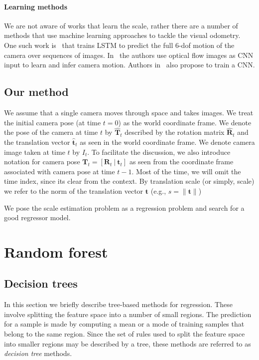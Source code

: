 \paragraph{Learning methods} We are not aware of works that learn the
scale, rather there are a number of methods that use machine learning
approaches to tackle the visual odometry.  One such work
is~\cite{wang2017deepvo} that trains LSTM to predict the full 6-dof
motion of the camera over sequences of
images. In~\cite{muller20017flowdometry} the authors use optical flow
images as CNN input to learn and infer camera motion. Authors
in~\cite{DBLP:journals/corr/MohantyADGSC16} also propose to train a
CNN.



\subsection{Our method}

We assume that a single camera moves through space and takes images.
We treat the initial camera pose (at time $t=0$) as the world
coordinate frame.  We denote the pose of the camera at time $t$ by
$\mathbf{\hat{T}}_t$ described by the rotation matrix
$\mathbf{\hat{R}}_t$ and the translation vector $\mathbf{\hat{t}}_t$
as seen in the world coordinate frame.  We denote camera image taken
at time $t$ by $I_t$.  To facilitate the discussion, we also introduce
notation for camera pose
$\mathbf{T}_t = [\mathbf{R}_t\ |\ \mathbf{t}_t] $ as seen from the
coordinate frame associated with camera pose at time $t-1$.  Most of
the time, we will omit the time index, since its clear from the
context.  By translation scale (or simply, scale) we refer to the norm
of the translation vector $\mathbf{t}$ (e.g.,
$s = \lVert \mathbf{t} \rVert$)

We pose the scale estimation problem as a regression problem and
search for a good regressor model.

\section{Random forest}

\subsection{Decision trees}

In this section we briefly describe tree-based methods for regression.
These involve splitting the feature space into a number of small
regions.  The prediction for a sample is made by computing a mean or a
mode of training samples that belong to the same region.  Since the
set of rules used to split the feature space into smaller regions may
be described by a tree, these methods are referred to as
\textit{decision tree} methods.

